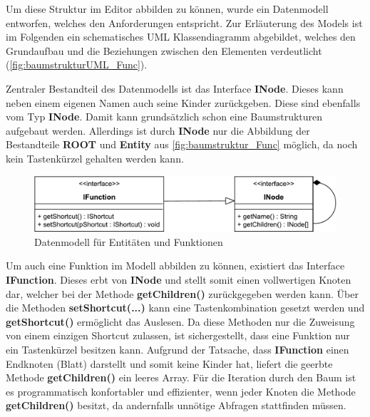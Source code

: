 Um diese Struktur im Editor abbilden zu können, wurde ein Datenmodell entworfen, welches den Anforderungen entspricht. Zur Erläuterung des Models ist im Folgenden ein schematisches UML Klassendiagramm abgebildet, welches den Grundaufbau und die Beziehungen zwischen den Elementen verdeutlicht (\autoref{fig:baumstrukturUML_Func}).

\vfill

Zentraler Bestandteil des Datenmodells ist das Interface \textbf{INode}. Dieses kann neben einem eigenen Namen auch seine Kinder zurückgeben. Diese sind ebenfalls vom Typ \textbf{INode}. Damit kann grundsätzlich schon eine Baumstrukturen aufgebaut werden. Allerdings ist durch \textbf{INode} nur die Abbildung der Bestandteile \textbf{ROOT} und \textbf{Entity} aus \autoref{fig:baumstruktur_Func} möglich, da noch kein Tastenkürzel gehalten werden kann.

\vfill

\begin{figure}[H]
	\vspace{20px}
	\centering
	\includegraphics[width=1\linewidth]{../graphic/diagrams/CD_Baumstruktur_Functions/Baumstruktur}
	\caption{Datenmodell für Entitäten und Funktionen}
	\label{fig:baumstrukturUML_Func}
\end{figure}

\vfill

Um auch eine Funktion im Modell abbilden zu können, existiert das Interface \textbf{IFunction}. Dieses erbt von \textbf{INode} und stellt somit einen vollwertigen Knoten dar, welcher bei der Methode \textbf{getChildren()} zurückgegeben werden kann. Über die Methoden \textbf{setShortcut(...)} kann eine Tastenkombination gesetzt werden und \textbf{getShortcut()} ermöglicht das Auslesen. Da diese Methoden nur die Zuweisung von einem einzigen Shortcut zulassen, ist sichergestellt, dass eine Funktion nur ein Tastenkürzel besitzen kann. Aufgrund der Tatsache, dass \textbf{IFunction} einen Endknoten (Blatt) darstellt und somit keine Kinder hat, liefert die geerbte Methode \textbf{getChildren()} ein leeres Array. Für die Iteration durch den Baum ist es programmatisch konfortabler und effizienter, wenn jeder Knoten die Methode \textbf{getChildren()} besitzt, da andernfalls unnötige Abfragen stattfinden müssen.

